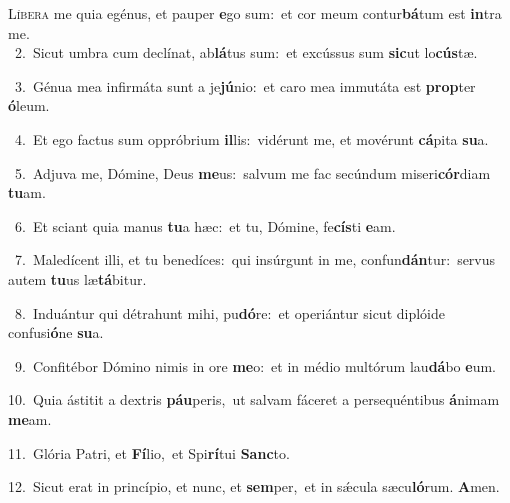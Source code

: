 \lettrine{\initial\textcolor{\initialcolor}{L}}{íbera} me quia egénus, et pauper \textbf{e}\-go sum:~\star et cor meum contur\-\textbf{bá}\-tum est \textbf{in}\-tra me.\\
{\numbfont\textcolor{\numbcolor}{~2.}}~Sicut umbra cum declínat, ab\-\textbf{lá}\-tus sum:~\star et excússus sum \textbf{sic}\-ut lo\-\textbf{cús}\-tæ.\par
{\numbfont\textcolor{\numbcolor}{~3.}}~Génua mea infirmáta sunt a je\-\textbf{jú}\-nio:~\star et caro mea immutáta est \textbf{prop}\-ter \textbf{ó}\-leum.\par
{\numbfont\textcolor{\numbcolor}{~4.}}~Et ego factus sum oppróbrium \textbf{il}\-lis:~\star vidérunt me, et movérunt \textbf{cá}\-pita \textbf{su}\-a.\par
{\numbfont\textcolor{\numbcolor}{~5.}}~Adjuva me, Dómine, Deus \textbf{me}\-us:~\star salvum me fac secúndum miseri\-\textbf{cór}\-diam \textbf{tu}\-am.\par
{\numbfont\textcolor{\numbcolor}{~6.}}~Et sciant quia manus \textbf{tu}\-a hæc:~\star et tu, Dómine, fe\-\textbf{cís}\-ti \textbf{e}\-am.\par
{\numbfont\textcolor{\numbcolor}{~7.}}~Maledícent illi, et tu benedíces:~\dagger qui insúrgunt in me, confun\-\textbf{dán}\-tur:~\star servus autem \textbf{tu}\-us læ\-\textbf{tá}\-bitur.\par
{\numbfont\textcolor{\numbcolor}{~8.}}~Induántur qui détrahunt mihi, pu\-\textbf{dó}\-re:~\star et operiántur sicut diplóide confusi\-\textbf{ó}\-ne \textbf{su}\-a.\par
{\numbfont\textcolor{\numbcolor}{~9.}}~Confitébor Dómino nimis in ore \textbf{me}\-o:~\star et in médio multórum lau\-\textbf{dá}\-bo \textbf{e}\-um.\par
{\numbfont\textcolor{\numbcolor}{10.}}~Quia ástitit a dextris \textbf{páu}\-peris,~\star ut salvam fáceret a persequéntibus \textbf{á}\-nimam \textbf{me}\-am.\par
{\numbfont\textcolor{\numbcolor}{11.}}~Glória Patri, et \textbf{Fí}\-lio,~\star et Spi\-\textbf{rí}\-tui \textbf{Sanc}\-to.\par
{\numbfont\textcolor{\numbcolor}{12.}}~Sicut erat in princípio, et nunc, et \textbf{sem}\-per,~\star et in sǽcula sæcu\-\textbf{ló}\-rum. \textbf{A}\-men.\par
